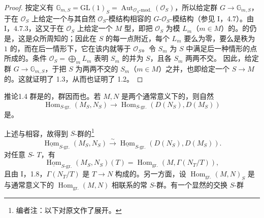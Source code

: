 \begin{proof}
按定义有 $\mathbb G_{m,S}=\mathrm{GL}(1)_S=\operatorname{Aut}_{\mathcal O_S\text{-}\mathrm{mod.}}(\mathcal O_S)$，所以给定群 $G\to\mathbb G_{m,S}$，于在 $\mathcal O_S$ 上给定一个与其自然 $\mathcal O_S$-模结构相容的 $G$-$\mathcal O_S$-模结构（参见 I，4.7）。由 I，4.7.3，这又于在 $\mathcal O_S$ 上给定一个 $M$ 型，即把 $\mathcal O_S$ 为模 $L_m$（$m\in M$）的。的仍是，这是众所周知的；因此在 $S$ 的每一点附近，每个 $L_m$ 要么为零，要么是秩为 $1$ 的，而在后一情形下，它在该内就等于 $\mathcal O_S$。令 $S_m$ 为 $S$ 中满足后一种情形的点所成的。条件 $\mathcal O_S=\bigoplus_m L_m$ 表明 $S_m$ 的并为 $S$，且各 $S_m$ 两两不交。
因此，给定群 $G\to\mathbb G_{m,S}$，于把 $S$ 为两两不交的 $S_m$（$m\in M$）之并，也即给定一个 $S\to M$ 的。这就证明了 1.3，从而也证明了 1.2。
\end{proof}
\begin{SGAresult}{推论}{1.4}
群是的，群因而也。若 $M,N$ 是两个通常意义下的，则自然
\[
\operatorname{Hom}_{S\text{-}\mathrm{gr.}}(M_S,N_S)\longrightarrow
\operatorname{Hom}_{S\text{-}\mathrm{gr.}}(D(N_S),D(M_S))
\]
是。
\end{SGAresult}
上述与相容，故得到 $S$-群的\footnote[4]{编者注：以下对原文作了展开。}
\[
\underline{\operatorname{Hom}}_{S\text{-}\mathrm{gr.}}(M_S,N_S)\xrightarrow{\sim}
\underline{\operatorname{Hom}}_{S\text{-}\mathrm{gr.}}(D(N_S),D(M_S)).\tag{1}
\]
对任意 $S$- $T$，有
\[
\underline{\operatorname{Hom}}_{S\text{-}\mathrm{gr.}}(M_S,N_S)(T)
=\operatorname{Hom}_{\mathrm{gr.}}(M,\Gamma(N_T/T)),
\]
且由 I，1.8，$\Gamma(N_T/T)$ 是 $T\to N$ 构成的。另一方面，设 $\operatorname{Hom}_{\mathrm{gr.}}(M,N)_S$ 是与通常意义下的 $\operatorname{Hom}_{\mathrm{gr.}}(M,N)$ 相联系的常 $S$-群。有一个显然的交换 $S$-群
